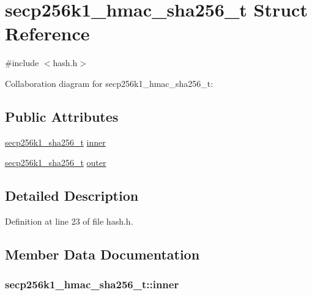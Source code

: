 \hypertarget{structsecp256k1__hmac__sha256__t}{}\section{secp256k1\+\_\+hmac\+\_\+sha256\+\_\+t Struct Reference}
\label{structsecp256k1__hmac__sha256__t}


{\ttfamily \#include $<$hash.\+h$>$}



Collaboration diagram for secp256k1\+\_\+hmac\+\_\+sha256\+\_\+t\+:
\subsection*{Public Attributes}
\begin{DoxyCompactItemize}
\item 
\hyperlink{structsecp256k1__sha256__t}{secp256k1\+\_\+sha256\+\_\+t} \hyperlink{structsecp256k1__hmac__sha256__t_afba1e789776f5c3cd2c1e6d9e718065f}{inner}
\item 
\hyperlink{structsecp256k1__sha256__t}{secp256k1\+\_\+sha256\+\_\+t} \hyperlink{structsecp256k1__hmac__sha256__t_a3974e44471231d09a8d282ef62e0b77a}{outer}
\end{DoxyCompactItemize}


\subsection{Detailed Description}


Definition at line 23 of file hash.\+h.



\subsection{Member Data Documentation}
\hypertarget{structsecp256k1__hmac__sha256__t_afba1e789776f5c3cd2c1e6d9e718065f}{}
\subsubsection[{inner}]{ secp256k1\+\_\+hmac\+\_\+sha256\+\_\+t\+::inner}\label{structsecp256k1__hmac__sha256__t_afba1e789776f5c3cd2c1e6d9e718065f}


